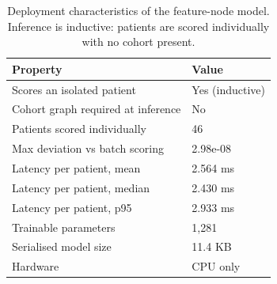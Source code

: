 \begin{table}[t]
\centering
\caption{Deployment characteristics of the feature-node model. Inference is inductive: patients are scored individually with no cohort present.}
\label{tab:deploy}
\small
\begin{tabular}{p{3.1cm}p{4.6cm}}
\toprule
Property & Value \\
\midrule
Scores an isolated patient & Yes (inductive) \\
Cohort graph required at inference & No \\
Patients scored individually & 46 \\
Max deviation vs batch scoring & 2.98e-08 \\
Latency per patient, mean & 2.564 ms \\
Latency per patient, median & 2.430 ms \\
Latency per patient, p95 & 2.933 ms \\
Trainable parameters & 1,281 \\
Serialised model size & 11.4 KB \\
Hardware & CPU only \\
\bottomrule
\end{tabular}
\end{table}
